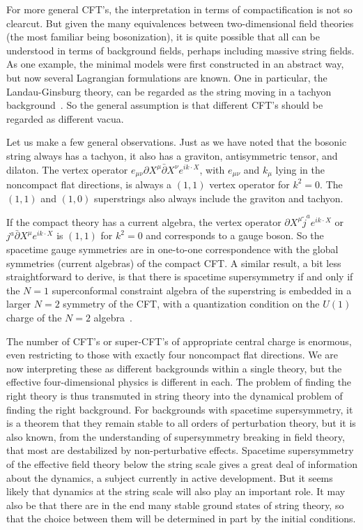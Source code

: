 For more general CFT's, the interpretation in terms of
compactification is not so clearcut.  But given the many equivalences
between two-dimensional field theories (the most familiar being
bosonization), it is quite possible that all can be understood in terms
of background fields, perhaps including massive string fields.  As one
example, the minimal models were first constructed in an abstract way,
but now several Lagrangian formulations are known.  One in particular,
the Landau-Ginsburg theory, can be regarded as the string moving in a
tachyon background~\cite{Zlg}.  So the general assumption
is that different CFT's should be regarded as different vacua.
 
Let us make a few general observations.  Just as we have noted that
the bosonic string always has a tachyon, it also has a graviton,
antisymmetric tensor, and dilaton.  The vertex operator
$e_{\mu\nu}\partial X^\mu \bar\partial X^\nu e^{ik\cdot X}$, with
$e_{\mu\nu}$ and $k_\mu$ lying in the noncompact flat directions, is
always a $(1,1)$ vertex operator for $k^2 = 0$.
The $(1,1)$ and $(1,0)$ superstrings also always include the graviton
and tachyon.

If the compact theory has a current algebra, the vertex
operator $\partial X^\mu \tilde j^a e^{i k \cdot X}$ or
$j^a \bar\partial X^\mu e^{i k \cdot X}$ is $(1,1)$ for $k^2 = 0$ and
corresponds to a gauge boson.  So the spacetime gauge symmetries are
in one-to-one correspondence with the global symmetries (current
algebras) of the compact CFT.  A similar result, a bit less
straightforward to derive, is that there is spacetime supersymmetry if
and only if the $N=1$ superconformal constraint algebra of the
superstring is embedded in a larger $N=2$ symmetry of the CFT, with
a quantization condition on the $U(1)$ charge of the $N=2$
algebra~\cite{BDFM}.

The number of CFT's or super-CFT's of appropriate central charge is
enormous, even restricting to those with exactly four noncompact flat
directions.  We are now interpreting these as different backgrounds
within a single theory, but the
effective four-dimensional physics is different in each.  The
problem of finding the right theory is thus transmuted in string
theory into the dynamical problem of finding the right background.  
For backgrounds with spacetime supersymmetry, it is a theorem
that they remain stable to all orders of perturbation theory, but it
is also known, from the understanding of supersymmetry breaking in
field
theory, that most are destabilized by non-perturbative effects.
Spacetime supersymmetry of the effective field theory below the string
scale gives a great deal of information about the dynamics, a subject
currently in active development.  But it seems likely that dynamics
at the string scale will also play an important role.  It may also be
that there are in the end many stable ground states of string theory,
so that the choice between them will be determined in part by the
initial conditions.

